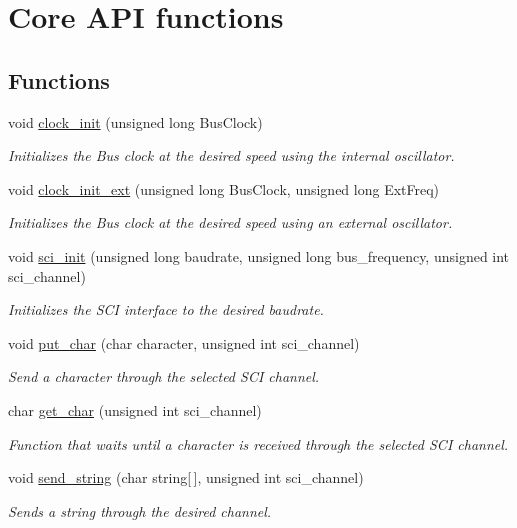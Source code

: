 \hypertarget{group___core}{}\section{Core A\+P\+I functions}
\label{group___core}
\subsection*{Functions}
\begin{DoxyCompactItemize}
\item 
void \hyperlink{group___core_gaad29837daff06258028589fec8d69f31}{clock\+\_\+init} (unsigned long Bus\+Clock)
\begin{DoxyCompactList}\small\item\em Initializes the Bus clock at the desired speed using the internal oscillator. \end{DoxyCompactList}\item 
void \hyperlink{group___core_ga6c78aff94957c5e31bca34b4fd427844}{clock\+\_\+init\+\_\+ext} (unsigned long Bus\+Clock, unsigned long Ext\+Freq)
\begin{DoxyCompactList}\small\item\em Initializes the Bus clock at the desired speed using an external oscillator. \end{DoxyCompactList}\item 
void \hyperlink{group___core_ga5064f416c84236092cef3147fe0036c1}{sci\+\_\+init} (unsigned long baudrate, unsigned long bus\+\_\+frequency, unsigned int sci\+\_\+channel)
\begin{DoxyCompactList}\small\item\em Initializes the S\+C\+I interface to the desired baudrate. \end{DoxyCompactList}\item 
void \hyperlink{group___core_ga487c3bdee8a71648e5133e7104f2bddf}{put\+\_\+char} (char character, unsigned int sci\+\_\+channel)
\begin{DoxyCompactList}\small\item\em Send a character through the selected S\+C\+I channel. \end{DoxyCompactList}\item 
char \hyperlink{group___core_ga0b72a0d9b0c7a786c00aec3b91cf0e30}{get\+\_\+char} (unsigned int sci\+\_\+channel)
\begin{DoxyCompactList}\small\item\em Function that waits until a character is received through the selected S\+C\+I channel. \end{DoxyCompactList}\item 
void \hyperlink{group___core_ga9df467e6c221f71bbc6080694cc5c67c}{send\+\_\+string} (char string\mbox{[}$\,$\mbox{]}, unsigned int sci\+\_\+channel)
\begin{DoxyCompactList}\small\item\em Sends a string through the desired channel. \end{DoxyCompactList}\end{DoxyCompactItemize}


